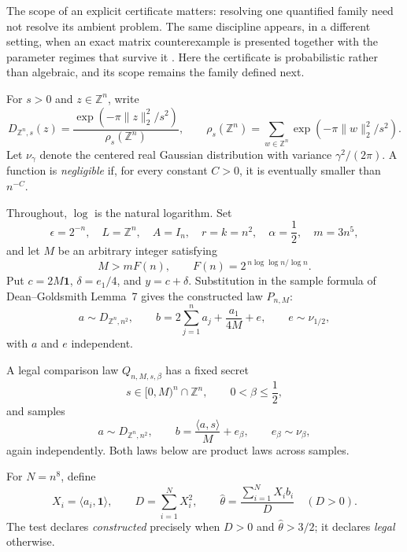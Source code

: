 \documentclass[11pt]{article}
\theoremstyle{remark}
\newcommand{\Z}{\mathbb Z}
\newcommand{\one}{\mathbf 1}
\begin{document}
The scope of an explicit certificate matters: resolving one quantified
family need not resolve its ambient problem.  The same discipline appears,
in a different setting, when an exact matrix counterexample is presented
together with the parameter regimes that survive it
\cite{ZengLiuRatnavelu2026}.  Here the certificate is probabilistic rather
than algebraic, and its scope remains the family defined next.

For \(s>0\) and \(z\in\Z^n\), write
\[
 D_{\Z^n,s}(z)=
 \frac{\exp(-\pi\lVert z\rVert_2^2/s^2)}{\rho_s(\Z^n)},
 \qquad
 \rho_s(\Z^n)=\sum_{w\in\Z^n}
 \exp(-\pi\lVert w\rVert_2^2/s^2).
\]
Let \(\nu_\gamma\) denote the centered real Gaussian distribution with
variance \(\gamma^2/(2\pi)\).  A function is \emph{negligible} if, for
every constant \(C>0\), it is eventually smaller than \(n^{-C}\).

Throughout, \(\log\) is the natural logarithm.  Set
\[
 \epsilon=2^{-n},\quad L=\Z^n,\quad A=I_n,\quad
 r=k=n^2,\quad \alpha=\frac12,\quad m=3n^5,
 \tag{1}
\]
and let \(M\) be an arbitrary integer satisfying
\[
 M>mF(n),
 \qquad
 F(n)=2^{\,n\log\log n/\log n}.
 \tag{2}
\]
Put \(c=2M\one\), \(\delta=e_1/4\), and \(y=c+\delta\).
Substitution in the sample formula of Dean--Goldsmith Lemma~7 gives the
constructed law \(P_{n,M}\):
\[
 a\sim D_{\Z^n,n^2},\qquad
 b=2\sum_{j=1}^n a_j+\frac{a_1}{4M}+e,
 \qquad e\sim\nu_{1/2},
 \tag{3}
\]
with \(a\) and \(e\) independent.

A legal comparison law \(Q_{n,M,s,\beta}\) has a fixed secret
\[
 s\in{[0,M)}^n\cap\Z^n,
 \qquad 0<\beta\le\frac12,
 \tag{4}
\]
and samples
\[
 a\sim D_{\Z^n,n^2},\qquad
 b=\frac{\langle a,s\rangle}{M}+e_\beta,
 \qquad e_\beta\sim\nu_\beta,
 \tag{5}
\]
again independently.  Both laws below are product laws across samples.

For \(N=n^8\), define
\[
 X_i=\langle a_i,\one\rangle,\qquad
 D=\sum_{i=1}^N X_i^2,\qquad
 \widehat\theta=\frac{\sum_{i=1}^N X_i b_i}{D}
 \quad(D>0).
 \tag{6}
\]
The test declares \emph{constructed} precisely when
\(D>0\) and \(\widehat\theta>3/2\); it declares \emph{legal}
otherwise.
\end{document}
